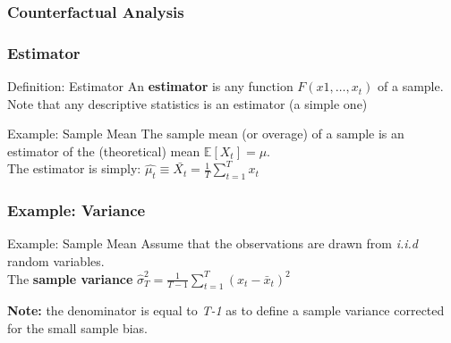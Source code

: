 \documentclass{beamer}
\begin{document}
\begin{frame}
\frametitle{Counterfactual Analysis}
\end{frame}




\begin{frame}
  \frametitle{Estimator}

  \begin{block}{Definition: Estimator}
    An \textbf{estimator} is any function $F(x1, \dots, x_t)$ of a sample. Note that any descriptive statistics is an estimator (a simple one) 
  \end{block}


  \begin{exampleblock}{Example: Sample Mean}
    The sample mean (or overage) of a sample is an estimator of the (theoretical) mean $ \mathbb{E}[X_t] = \mu$.\\
    The estimator is simply: $\hat{\mu_t} \equiv \bar{X_t} = \frac{1}{T} \sum_{t=1}^{T}x_t$
  \end{exampleblock}
  
\end{frame}


\begin{frame}
  \frametitle{Example: Variance}

  \begin{exampleblock}{Example: Sample Mean}
    Assume that the observations are drawn from \emph{i.i.d} random variables.\\
    The \textbf{sample variance} $\hat{\sigma}^2_T = \frac{1}{T-1} \sum_{t=1}^T (x_t - \bar{x}_t)^2$
  \end{exampleblock}

\textbf{Note:} the denominator is equal to \emph{T-1} as to define a sample variance corrected for the small sample bias. 
  
\end{frame}
\end{document}
